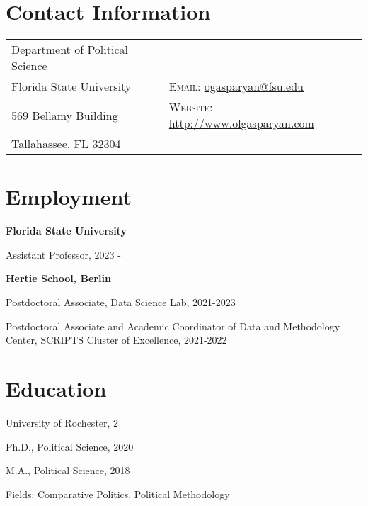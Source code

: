 \documentclass[margin,line,10.95pt]{res}
\newenvironment{list1}{
  \begin{list}{\ding{113}}{%
      \setlength{\itemsep}{0in}
      \setlength{\parsep}{0in} \setlength{\parskip}{0in}
      \setlength{\topsep}{0in} \setlength{\partopsep}{0in}
      \setlength{\leftmargin}{0.17in}}}{\end{list}}
\begin{document}

\begin{resume}
\section{\sc Contact Information}
\vspace{.05in}
\begin{tabular}{@{}p{2.5in}p{4in}}
Department of Political Science            &  \\
Florida State University  & \textsc{Email}: \href{mailto:ogasparyan@fsu.edu}{ogasparyan@fsu.edu} \\
569 Bellamy Building & \textsc{Website}: \href{http://www.olgasparyan.com}{http://www.olgasparyan.com} \\
Tallahassee, FL 32304     \\
\end{tabular}

\section{\sc Employment}
{\textbf{Florida State University}}\\
\vspace*{-.1in}
\begin{list1}
	\item[] Assistant Professor, 2023 -

\end{list1}


\textbf{Hertie School, Berlin}\\
\vspace*{-.1in}
\begin{list1}
	\item[] Postdoctoral Associate, Data Science Lab, 2021-2023
	\item[] Postdoctoral Associate and Academic Coordinator of Data and Methodology Center, SCRIPTS Cluster of Excellence, 2021-2022

\end{list1}

\section{\sc Education}
{University of Rochester}, 2\\
\vspace*{-.1in}
\begin{list1}
\item[] Ph.D., Political Science, 2020 
\item[] M.A., Political Science, 2018 
\item[] Fields: Comparative Politics, Political Methodology 
\end{list1}


\end{resume}
\end{document}
